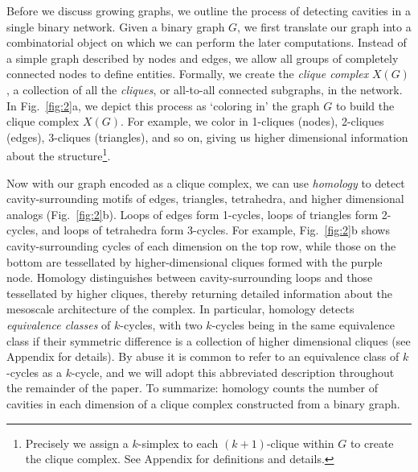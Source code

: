 \documentclass{article}
\begin{document}
Before we discuss growing graphs, we outline the process of detecting cavities in a single binary network. Given a binary graph $G$, we first translate our graph into a combinatorial object on which we can perform the later computations. Instead of a simple graph described by nodes and edges, we allow all groups of completely connected nodes to define entities. Formally, we create the \emph{clique complex} $X(G)$, a collection of all the \emph{cliques}, or all-to-all connected subgraphs, in the network. In Fig.~\ref{fig:2}a, we depict this process as `coloring in' the graph $G$ to build the clique complex $X(G)$. For example, we color in 1-cliques (nodes), 2-cliques (edges), 3-cliques (triangles), and so on, giving us higher dimensional information about the structure\footnote{Precisely we assign a $k$-simplex to each $(k+1)$-clique within $G$ to create the clique complex. See Appendix for definitions and details.}.


Now with our graph encoded as a clique complex, we can use \emph{homology} to detect cavity-surrounding motifs of edges, triangles, tetrahedra, and higher dimensional analogs (Fig.~\ref{fig:2}b). Loops of edges form 1-cycles, loops of triangles form 2-cycles, and loops of tetrahedra form 3-cycles. For example, Fig.~\ref{fig:2}b shows cavity-surrounding cycles of each dimension on the top row, while those on the bottom are tessellated by higher-dimensional cliques formed with the purple node. Homology distinguishes between cavity-surrounding loops and those tessellated by higher cliques, thereby returning detailed information about the mesoscale architecture of the complex. In particular, homology detects \emph{equivalence classes} of $k$-cycles, with two $k$-cycles being in the same equivalence class if their symmetric difference is a collection of higher dimensional cliques (see Appendix for details). By abuse it is common to refer to an equivalence class of $k$-cycles as a $k$-cycle, and we will adopt this abbreviated description throughout the remainder of the paper. To summarize: homology counts the number of cavities in each dimension of a clique complex constructed from a binary graph.
\end{document}
